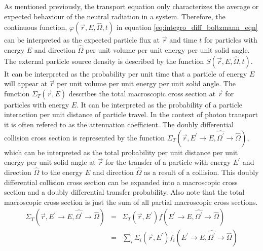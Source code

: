 As mentioned previously, the transport equation only characterizes the average
or expected behaviour of the neutral radiation in a system. Therefore, the
continuous function, $\varphi(\vec{r},E,\hat{\Omega},t)$ in equation 
\ref{eq:integro_diff_boltzmann_eqn} can be interpreted as the expected particle 
flux at $\vec{r}$ and time $t$ for particles with energy $E$ and direction
$\hat{\Omega}$ per unit volume per unit energy per unit solid angle. The 
external particle source density is described by the function 
$S(\vec{r},E,\hat{\Omega},t)$. It can be interpreted as the probability per
unit time that a particle of energy $E$ will appear at $\vec{r}$ per unit 
volume per unit energy per unit solid angle. The function $\Sigma_T(\vec{r},E)$ 
describes the total macroscopic cross section at $\vec{r}$ for particles with 
energy $E$. It can be interpreted as the probability of a particle interaction 
per unit distance of particle travel. In the context of photon transport it is 
often refered to as the attenuation coefficient. The doubly differential 
collision cross section is represented by the function 
$\Sigma_T(\vec{r},E^{'} \to E,\hat{\Omega^{'}} \to \hat{\Omega})$, which can be 
interpreted as the total probability per unit distance per unit energy per unit 
solid angle at $\vec{r}$ for the transfer of a particle with energy $E^{'}$ and 
direction $\hat{\Omega}$ to the energy $E$ and direction $\hat{\Omega}$ as a 
result of a collision. This doubly differential collision cross section can be 
expanded into a macroscopic cross section and a doubly differential transfer 
probability. Also note that the total macroscopic cross section is just the sum 
of all partial macroscopic cross sections.
\begin{eqnarray}
  \Sigma_T(\vec{r},E^{'} \to E,\hat{\Omega^{'}} \to \hat{\Omega}) & = &
  \Sigma_T(\vec{r},E^{'})f(E^{'} \to E,\hat{\Omega^{'}} \to \hat{\Omega}) \\
  & = & \sum_i \Sigma_i(\vec{r},E^{'})
  f_i(E^{'} \to E,\hat{\Omega^{'}} \to \hat{\Omega})
\end{eqnarray}


